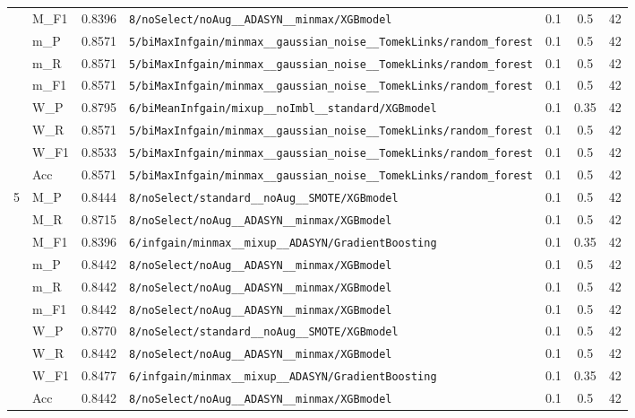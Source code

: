 \begin{table}[htbp]
\begin{tabular}{|c|l|c|>{\ttfamily\footnotesize}p{7.2cm}|c|c|c|}
 & M\_F1 & 0.8396 & \texttt{8/noSelect/noAug\_\_ADASYN\_\_minmax/XGBmodel} & 0.1 & 0.5  & 42 \\ 
 & m\_P & 0.8571 & \texttt{5/biMaxInfgain/minmax\_\_gaussian\_noise\_\_TomekLinks/random\_forest} & 0.1 & 0.5  & 42 \\ 
 & m\_R & 0.8571 & \texttt{5/biMaxInfgain/minmax\_\_gaussian\_noise\_\_TomekLinks/random\_forest} & 0.1 & 0.5  & 42 \\ 
 & m\_F1 & 0.8571 & \texttt{5/biMaxInfgain/minmax\_\_gaussian\_noise\_\_TomekLinks/random\_forest} & 0.1 & 0.5  & 42 \\ 
 & W\_P & 0.8795 & \texttt{6/biMeanInfgain/mixup\_\_noImbl\_\_standard/XGBmodel} & 0.1 & 0.35  & 42 \\ 
 & W\_R & 0.8571 & \texttt{5/biMaxInfgain/minmax\_\_gaussian\_noise\_\_TomekLinks/random\_forest} & 0.1 & 0.5  & 42 \\ 
 & W\_F1 & 0.8533 & \texttt{5/biMaxInfgain/minmax\_\_gaussian\_noise\_\_TomekLinks/random\_forest} & 0.1 & 0.5  & 42 \\ 
 & Acc & 0.8571 & \texttt{5/biMaxInfgain/minmax\_\_gaussian\_noise\_\_TomekLinks/random\_forest} & 0.1 & 0.5  & 42 \\ 
\hline
\multirow{10}{*}{5} & M\_P & 0.8444 & \texttt{8/noSelect/standard\_\_noAug\_\_SMOTE/XGBmodel} & 0.1 & 0.5  & 42 \\ 
 & M\_R & 0.8715 & \texttt{8/noSelect/noAug\_\_ADASYN\_\_minmax/XGBmodel} & 0.1 & 0.5  & 42 \\ 
 & M\_F1 & 0.8396 & \texttt{6/infgain/minmax\_\_mixup\_\_ADASYN/GradientBoosting} & 0.1 & 0.35  & 42 \\ 
 & m\_P & 0.8442 & \texttt{8/noSelect/noAug\_\_ADASYN\_\_minmax/XGBmodel} & 0.1 & 0.5  & 42 \\ 
 & m\_R & 0.8442 & \texttt{8/noSelect/noAug\_\_ADASYN\_\_minmax/XGBmodel} & 0.1 & 0.5  & 42 \\ 
 & m\_F1 & 0.8442 & \texttt{8/noSelect/noAug\_\_ADASYN\_\_minmax/XGBmodel} & 0.1 & 0.5  & 42 \\ 
 & W\_P & 0.8770 & \texttt{8/noSelect/standard\_\_noAug\_\_SMOTE/XGBmodel} & 0.1 & 0.5  & 42 \\ 
 & W\_R & 0.8442 & \texttt{8/noSelect/noAug\_\_ADASYN\_\_minmax/XGBmodel} & 0.1 & 0.5  & 42 \\ 
 & W\_F1 & 0.8477 & \texttt{6/infgain/minmax\_\_mixup\_\_ADASYN/GradientBoosting} & 0.1 & 0.35  & 42 \\ 
 & Acc & 0.8442 & \texttt{8/noSelect/noAug\_\_ADASYN\_\_minmax/XGBmodel} & 0.1 & 0.5  & 42 \\ 
\hline
\end{tabular}
\end{table}